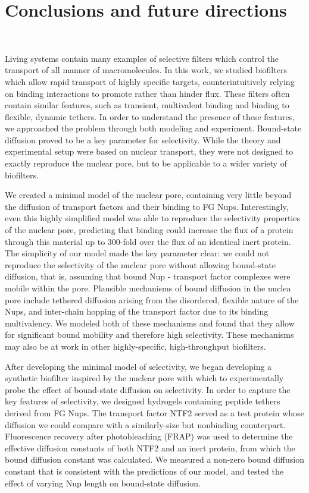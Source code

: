 \chapter{Conclusions and future directions}~\label{ch06_conclusions}

Living systems contain many examples of selective filters which control the transport of all manner of macromolecules.  In this work, we studied biofilters which allow rapid transport of highly specific targets, counterintuitively relying on binding interactions to promote rather than hinder flux.  These filters often contain similar features, such as transient, multivalent binding and binding to flexible, dynamic tethers.  In order to understand the presence of these features, we approached the problem through both modeling and experiment.  Bound-state diffusion proved to be a key parameter for selectivity.  While the theory and experimental setup were based on nuclear transport, they were not designed to exactly reproduce the nuclear pore, but to be applicable to a wider variety of biofilters.

We created a minimal model of the nuclear pore, containing very little beyond the diffusion of transport factors and their binding to FG Nups.  Interestingly, even this highly simplified model was able to reproduce the selectivity properties of the nuclear pore, predicting that binding could increase the flux of a protein through this material up to 300-fold over the flux of an identical inert protein.  The simplicity of our model made the key parameter clear: we could not reproduce the selectivity of the nuclear pore without allowing bound-state diffusion, that is, assuming that bound Nup - transport factor complexes were mobile within the pore.  Plausible mechanisms of bound diffusion in the nuclea pore include tethered diffusion arising from the disordered, flexible nature of the Nups, and inter-chain hopping of the transport factor due to its binding multivalency.  We modeled both of these mechanisms and found that they allow for significant bound mobility and therefore high selectivity.  These mechanisms may also be at work in other highly-specific, high-throughput biofilters.

After developing the minimal model of selectivity, we began developing a synthetic biofilter inspired by the nuclear pore with which to experimentally probe the effect of bound-state diffusion  on selectivity.  In order to capture the key features of selectivity, we designed hydrogels containing peptide tethers derived from FG Nups.  The transport factor NTF2 served as a test protein whose diffusion we could compare with a similarly-size but nonbinding counterpart.  Fluorescence recovery after photobleaching (FRAP) was used to determine the effective diffusion constants of both NTF2 and an inert protein, from which the bound diffusion constant was calculated. We measured a non-zero bound diffusion constant that is consistent with the predictions of our model, and tested the effect of varying Nup length on bound-state diffusion.

